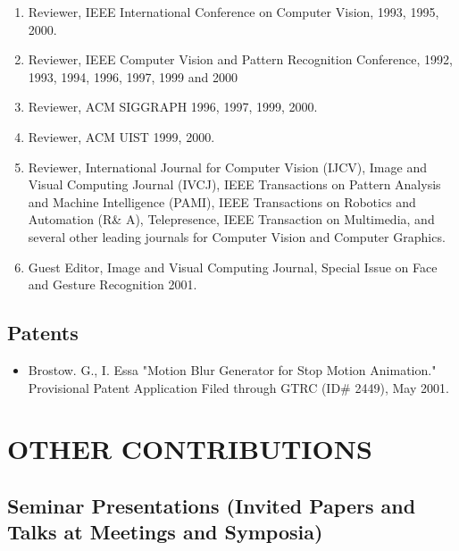 \begin{enumerate}
\item Reviewer, IEEE International Conference on Computer Vision,
1993, 1995, 2000.

\item Reviewer, IEEE Computer Vision and Pattern Recognition
Conference, 1992, 1993, 1994, 1996, 1997, 1999 and 2000

\item Reviewer, ACM SIGGRAPH 1996, 1997, 1999, 2000.

\item Reviewer, ACM UIST 1999, 2000.

\item Reviewer, International Journal for Computer Vision (IJCV),
Image and Visual Computing Journal (IVCJ), IEEE Transactions on
Pattern Analysis and Machine Intelligence (PAMI), IEEE
Transactions on Robotics and Automation (R\& A), Telepresence,
IEEE Transaction on Multimedia, and several other leading journals
for Computer Vision and Computer Graphics.

\item Guest Editor, Image and Visual Computing Journal, Special
Issue on Face and Gesture Recognition 2001.

\end{enumerate}

\subsection{Patents}

\begin{itemize}
\item Brostow. G., I. Essa "Motion Blur Generator for Stop Motion
Animation." Provisional Patent Application Filed through GTRC
(ID\# 2449), May 2001.
\end{itemize}


\section{OTHER CONTRIBUTIONS}
\label{sec:other}

\subsection{Seminar Presentations (Invited Papers and Talks at Meetings and Symposia)}
\label{subsec:seminar}

